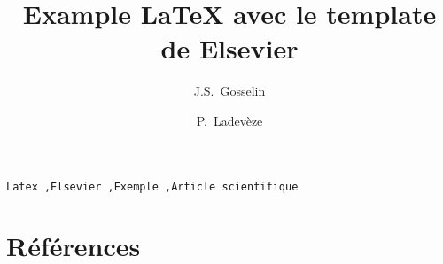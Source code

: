 


\begin{frontmatter} 

\title{Example \LaTeX{} avec le template de Elsevier}

\author[inrs]{J.S.~Gosselin}
\author[cgc]{P.~Ladevèze}

\address[inrs]{Institut national de la recherche scientifique, Centre Eau Terre Environnement, 490 rue de la Couronne, Quebec City, Quebec, Canada}
\address[cgc]{Geological Survey of Canada, Quebec Division, 490 rue de la Couronne, Quebec City, Quebec, Canada}

\begin{abstract}
    
\end{abstract}

\begin{keyword}
    \texttt{Latex \sep  Elsevier \sep Exemple \sep Article scientifique}
\end{keyword}
  
\end{frontmatter}

\linenumbers








\section*{Références} 



